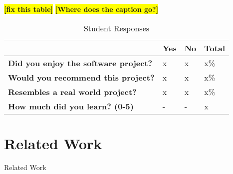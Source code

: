 \documentclass[conference]{IEEEtran}
\newcommand{\todo}[1]{\colorbox{yellow}{\textbf{[#1]}}}
\begin{document}
{%






%  






\todo{fix this table}
\todo{Where does the caption go?}
\begin{table}[h!]
\begin{center}
    \begin{tabular}{ l | l | l | l    }
    \toprule

	\bfseries & Yes & \bfseries No & \bfseries Total \\ \hline \hline
	\bfseries Did you enjoy the software project? & x & x & x\%  \\ \hline
	\bfseries Would you recommend this project? & x & x & x\%  \\ \hline
	\bfseries Resembles a real world project? & x & x & x\%  \\ \hline
	\bfseries How much did you learn? (0-5)& - & - & x  \\ 
 \bottomrule
    \end{tabular}
\end{center}
\caption{Student Responses}
\label{table:studentfeedback}
\end{table}




\section{Related Work}
\label{sec: relatedwork}

Related Work






}
\end{document}
